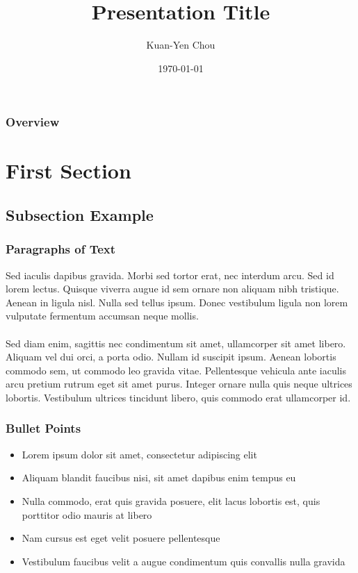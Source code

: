 \documentclass[10pt]{beamer}
\title[Short title]{Presentation Title}
\author{Kuan-Yen Chou}
\institute[UIUC] {
    University of Illinois at Urbana-Champaign \\ %
    \medskip
    \textit{kychou2@illinois.edu} %
}
\date{\today} %
\begin{document}
\begin{frame}
\titlepage %
\end{frame}

\begin{frame}
\frametitle{Overview} %
\tableofcontents
\end{frame}


\section{First Section}

\subsection{Subsection Example}


\begin{frame}
\frametitle{Paragraphs of Text}
Sed iaculis dapibus gravida. Morbi sed tortor erat, nec interdum arcu. Sed id
lorem lectus. Quisque viverra augue id sem ornare non aliquam nibh tristique.
Aenean in ligula nisl. Nulla sed tellus ipsum. Donec vestibulum ligula non lorem
vulputate fermentum accumsan neque mollis.\\~\\

Sed diam enim, sagittis nec condimentum sit amet, ullamcorper sit amet libero.
Aliquam vel dui orci, a porta odio. Nullam id suscipit ipsum. Aenean lobortis
commodo sem, ut commodo leo gravida vitae. Pellentesque vehicula ante iaculis
arcu pretium rutrum eget sit amet purus. Integer ornare nulla quis neque
ultrices lobortis. Vestibulum ultrices tincidunt libero, quis commodo erat
ullamcorper id.
\end{frame}


\begin{frame}
\frametitle{Bullet Points}
\begin{itemize}
\item Lorem ipsum dolor sit amet, consectetur adipiscing elit
\item Aliquam blandit faucibus nisi, sit amet dapibus enim tempus eu
\item Nulla commodo, erat quis gravida posuere, elit lacus lobortis est, quis
      porttitor odio mauris at libero
\item Nam cursus est eget velit posuere pellentesque
\item Vestibulum faucibus velit a augue condimentum quis convallis nulla gravida
\end{itemize}
\end{frame}
\end{document}

